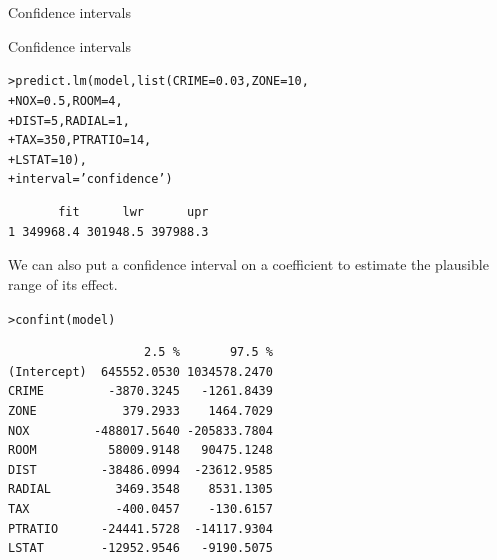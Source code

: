 \documentclass{beamer}\usepackage[]{graphicx}\usepackage[]{color}
\makeatletter
\newcommand{\hlnum}[1]{\textcolor[rgb]{0.824,0.412,0.118}{#1}}%
\newcommand{\hlstr}[1]{\textcolor[rgb]{1,0.894,0.71}{#1}}%
\newcommand{\hlstd}[1]{\textcolor[rgb]{1,0.894,0.769}{#1}}%
\newcommand{\hlkwc}[1]{\textcolor[rgb]{0.78,0.941,0.545}{#1}}%
\newcommand{\hlkwd}[1]{\textcolor[rgb]{1,0.78,0.769}{#1}}%
\newenvironment{kframe}{%
 \def\at@end@of@kframe{}%
 \ifinner\ifhmode%
  \def\at@end@of@kframe{\end{minipage}}%
  \begin{minipage}{\columnwidth}%
 \fi\fi%
 \def\FrameCommand##1{\hskip\@totalleftmargin \hskip-\fboxsep
 \colorbox{shadecolor}{##1}\hskip-\fboxsep
     \hskip-\linewidth \hskip-\@totalleftmargin \hskip\columnwidth}%
 \MakeFramed {\advance\hsize-\width
   \@totalleftmargin\z@ \linewidth\hsize
   \@setminipage}}%
 {\par\unskip\endMakeFramed%
 \at@end@of@kframe}
\newenvironment{knitrout}{}{} %
\makeatother
\begin{document}
\begin{darkframes}
\begin{frame}[fragile]{Confidence intervals}
    \end{frame}



    \begin{frame}[fragile]{Confidence intervals}
\begin{knitrout}
\begin{kframe}
\begin{alltt}
\hlstd{> }\hlkwd{predict.lm}\hlstd{(model,} \hlkwd{list}\hlstd{(}\hlkwc{CRIME}\hlstd{=}\hlnum{0.03}\hlstd{,} \hlkwc{ZONE}\hlstd{=}\hlnum{10}\hlstd{,}
\hlstd{+ }                       \hlkwc{NOX}\hlstd{=}\hlnum{0.5}\hlstd{,} \hlkwc{ROOM}\hlstd{=}\hlnum{4}\hlstd{,}
\hlstd{+ }                       \hlkwc{DIST}\hlstd{=}\hlnum{5}\hlstd{,}  \hlkwc{RADIAL}\hlstd{=}\hlnum{1}\hlstd{,}
\hlstd{+ }                       \hlkwc{TAX}\hlstd{=}\hlnum{350}\hlstd{,} \hlkwc{PTRATIO}\hlstd{=}\hlnum{14}\hlstd{,}
\hlstd{+ }                       \hlkwc{LSTAT}\hlstd{=}\hlnum{10}\hlstd{),}
\hlstd{+ }                       \hlkwc{interval} \hlstd{=} \hlstr{'confidence'}\hlstd{)}
\end{alltt}
\begin{verbatim}
       fit      lwr      upr
1 349968.4 301948.5 397988.3
\end{verbatim}
\end{kframe}
\end{knitrout}
     \lc
     \end{frame}



     \begin{frame}[fragile]%
        We can also put a confidence interval on a coefficient to estimate the plausible range of its effect.

        \fontsize{9}{9}\selectfont

\begin{knitrout}
\begin{kframe}
\begin{alltt}
\hlstd{> }\hlkwd{confint}\hlstd{(model)}
\end{alltt}
\begin{verbatim}
                   2.5 %       97.5 %
(Intercept)  645552.0530 1034578.2470
CRIME         -3870.3245   -1261.8439
ZONE            379.2933    1464.7029
NOX         -488017.5640 -205833.7804
ROOM          58009.9148   90475.1248
DIST         -38486.0994  -23612.9585
RADIAL         3469.3548    8531.1305
TAX            -400.0457    -130.6157
PTRATIO      -24441.5728  -14117.9304
LSTAT        -12952.9546   -9190.5075
\end{verbatim}
\end{kframe}
\end{knitrout}


\end{frame}
\end{darkframes}
\end{document}
